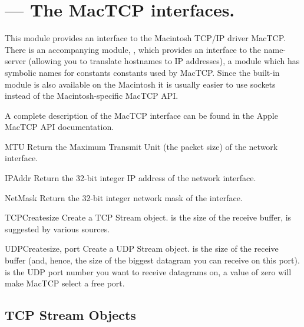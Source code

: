 \section{ ---
         The MacTCP interfaces.}




This module provides an interface to the Macintosh TCP/IP driver%
 MacTCP\@. There is an accompanying module,
, which provides an interface to
the name-server (allowing you to translate hostnames to IP addresses),
a module  which has
symbolic names for constants constants used by MacTCP. Since the
built-in module  is also available on the Macintosh it
is usually easier to use sockets instead of the Macintosh-specific
MacTCP API.

A complete description of the MacTCP interface can be found in the
Apple MacTCP API documentation.

\begin{funcdesc}{MTU}{}
Return the Maximum Transmit Unit (the packet size) of the network
interface.
\end{funcdesc}

\begin{funcdesc}{IPAddr}{}
Return the 32-bit integer IP address of the network interface.
\end{funcdesc}

\begin{funcdesc}{NetMask}{}
Return the 32-bit integer network mask of the interface.
\end{funcdesc}

\begin{funcdesc}{TCPCreate}{size}
Create a TCP Stream object.  is the size of the receive
buffer,  is suggested by various sources.
\end{funcdesc}

\begin{funcdesc}{UDPCreate}{size, port}
Create a UDP Stream object.  is the size of the receive
buffer (and, hence, the size of the biggest datagram you can receive
on this port).  is the UDP port number you want to receive
datagrams on, a value of zero will make MacTCP select a free port.
\end{funcdesc}


\subsection{TCP Stream Objects}

